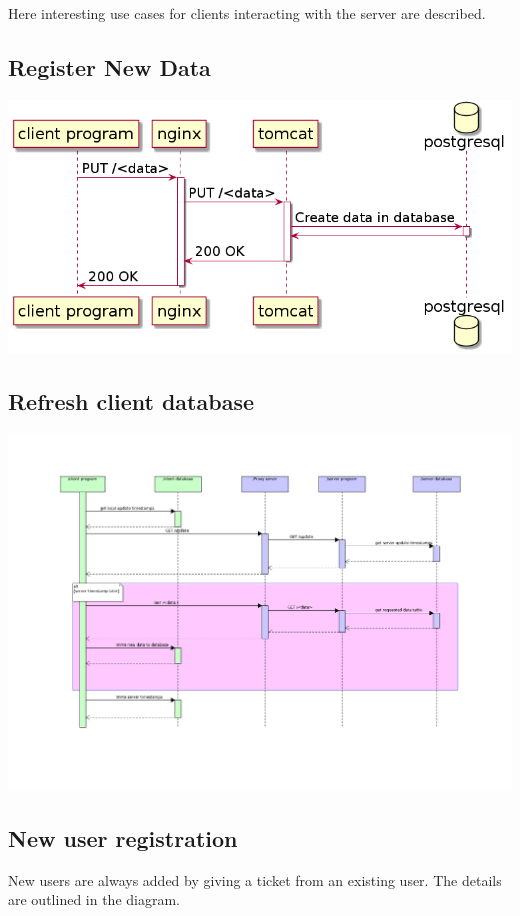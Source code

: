 \documentclass[12pt]{report}
\begin{document}
Here interesting use cases for clients interacting with the server
are described.

\subsection{Register New Data}

\includegraphics[width=\linewidth]{diagrams/put-data.png}

\subsection{Refresh client database}

\includegraphics[width=\linewidth]{diagrams/Refreshment.png}

\subsection{New user registration}

New users are always added by giving a ticket from an existing user. The details are outlined in the diagram. 
\end{document}
